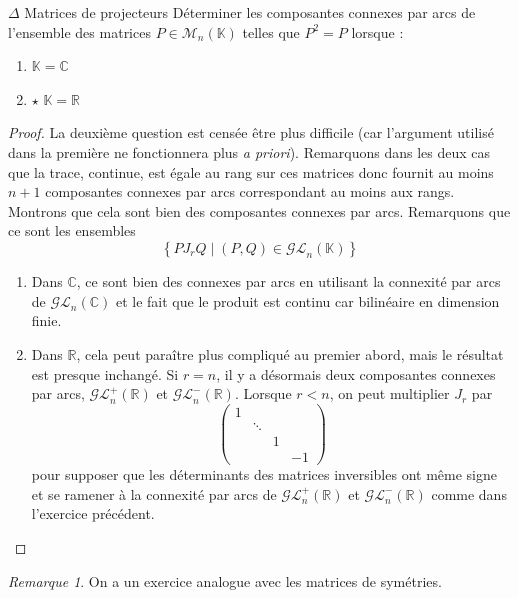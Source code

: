 \documentclass[french,a4paper]{article}
\newcommand{\R}{\mathbb{R}}
\newcommand{\C}{\mathbb{C}}
\newcommand{\K}{\mathbb{K}}
\theoremstyle{plain}
\theoremstyle{definition}
\theoremstyle{remark}
\newtheorem*{rmq}{Remarque}
\begin{document}
\begin{ex}[Moulin.52]{$\Delta$ Matrices de projecteurs}
	Déterminer les composantes connexes par arcs de l'ensemble des matrices $P\in\mathcal{M}_n(\K)$ telles que $P^2=P$ lorsque :
	\begin{enumerate}
		\item $\K=\C$
		\item $\star$ $\K=\R$
	\end{enumerate} 
\end{ex}
\begin{proof}
	La deuxième question est censée être plus difficile (car l'argument utilisé dans la première ne fonctionnera plus \textit{a priori}). Remarquons dans les deux cas que la trace, continue, est égale au rang sur ces matrices donc fournit au moins $n+1$ composantes connexes par arcs correspondant au moins aux rangs. Montrons que cela sont bien des composantes connexes par arcs. Remarquons que ce sont les ensembles $$\left\{PJ_rQ\mid (P,Q)\in\mathcal{GL}_n(\K)\right\}$$
	\begin{enumerate}
		\item Dans $\C$, ce sont bien des connexes par arcs en utilisant la connexité par arcs de $\mathcal{GL}_n(\C)$ et le fait que le produit est continu car bilinéaire en dimension finie.
		\item Dans $\R$, cela peut paraître plus compliqué au premier abord, mais le résultat est presque inchangé. Si $r=n$, il y a désormais deux composantes connexes par arcs, $\mathcal{GL}_n^+(\R)$ et $\mathcal{GL}_n^-(\R)$. Lorsque $r<n$, on peut multiplier $J_r$ par $$\begin{pmatrix}
			1&&\\
			&\ddots&&\\
			&&1&\\
			&&&-1
		\end{pmatrix}$$ pour supposer que les déterminants des matrices inversibles ont même signe et se ramener à la connexité par arcs de $\mathcal{GL}_n^+(\R)$ et $\mathcal{GL}_n^-(\R)$ comme dans l'exercice précédent.
	\end{enumerate}
\end{proof}
\begin{rmq}
	On a un exercice analogue avec les matrices de symétries.
\end{rmq}
\end{document}
